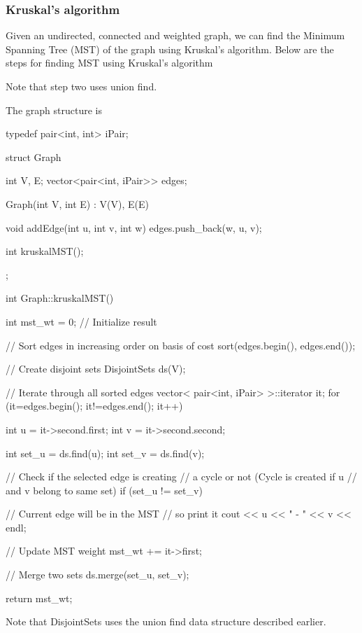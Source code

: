\documentclass{report}
\begin{document}
\subsubsection{Kruskal's algorithm}
\bigbreak \noindent 
Given an undirected, connected and weighted graph, we can find the Minimum Spanning Tree (MST) of the graph using Kruskal’s algorithm.
\bigbreak \noindent 
Below are the steps for finding MST using Kruskal’s algorithm
\bigbreak \noindent 
Note that step two uses union find.

\bigbreak \noindent 
The graph structure is
\begin{cppcode}
typedef pair<int, int> iPair; 

struct Graph { 
    int V, E; 
    vector<pair<int, iPair>> edges; 

    Graph(int V, int E) : V(V), E(E) {}

    void addEdge(int u, int v, int w) { 
        edges.push_back({w, {u, v}}); 
    } 

    int kruskalMST(); 
}; 
\end{cppcode}

\pagebreak \bigbreak \noindent 
\begin{cppcode}
int Graph::kruskalMST() 
{ 
    int mst_wt = 0; // Initialize result 
  
    // Sort edges in increasing order on basis of cost 
    sort(edges.begin(), edges.end()); 
  
    // Create disjoint sets 
    DisjointSets ds(V); 
  
    // Iterate through all sorted edges 
    vector< pair<int, iPair> >::iterator it; 
    for (it=edges.begin(); it!=edges.end(); it++) 
    { 
        int u = it->second.first; 
        int v = it->second.second; 
  
        int set_u = ds.find(u); 
        int set_v = ds.find(v); 
  
        // Check if the selected edge is creating 
        // a cycle or not (Cycle is created if u 
        // and v belong to same set) 
        if (set_u != set_v) 
        { 
            // Current edge will be in the MST 
            // so print it 
            cout << u << " - " << v << endl; 
  
            // Update MST weight 
            mst_wt += it->first; 
  
            // Merge two sets 
            ds.merge(set_u, set_v); 
        } 
    } 
  
    return mst_wt; 
} 
\end{cppcode}
\bigbreak \noindent 
Note that DisjointSets uses the union find data structure described earlier.
\end{document}
